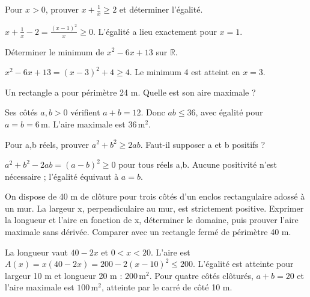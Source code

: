 \documentclass[11pt]{article}
\begin{document}
Pour \(x>0\), prouver \(x+\frac{1}{x}\geq 2\) et déterminer l’égalité.\par
\(x+\frac{1}{x}-2=\frac{(x-1)^{2}}{x}\geq 0\). L’égalité a lieu exactement pour \(x=1\).\par
{}
Déterminer le minimum de \(x^{2}-6x+13\) sur \(\mathbb{R}\).\par
\(x^{2}-6x+13=(x-3)^{2}+4\geq 4\). Le minimum 4 est atteint en \(x=3\).\par
{}
Un rectangle a pour périmètre 24 m. Quelle est son aire maximale ?\par
Ses côtés \(a,b>0\) vérifient \(a+b=12\). Donc \(ab\leq 36\), avec égalité pour \(a=b=6\,\mathrm{m}\). L’aire maximale est \(36\,\mathrm{m}^{2}\).\par
{}
Pour a,b réels, prouver \(a^{2}+b^{2}\geq 2ab\). Faut-il supposer a et b positifs ?\par
\(a^{2}+b^{2}-2ab=(a-b)^{2}\geq 0\) pour tous réels a,b. Aucune positivité n’est nécessaire ; l’égalité équivaut à \(a=b\).\par
{}
On dispose de 40 m de clôture pour trois côtés d’un enclos rectangulaire adossé à un mur. La largeur x, perpendiculaire au mur, est strictement positive. Exprimer la longueur et l’aire en fonction de x, déterminer le domaine, puis prouver l’aire maximale sans dérivée. Comparer avec un rectangle fermé de périmètre 40 m.\par
La longueur vaut \(40-2x\) et \(0<x<20\). L’aire est \(A(x)=x(40-2x)=200-2(x-10)^{2}\leq 200\). L’égalité est atteinte pour largeur 10 m et longueur 20 m : \(200\,\mathrm{m}^{2}\). Pour quatre côtés clôturés, \(a+b=20\) et l’aire maximale est \(100\,\mathrm{m}^{2}\), atteinte par le carré de côté 10 m.\par
\end{document}
